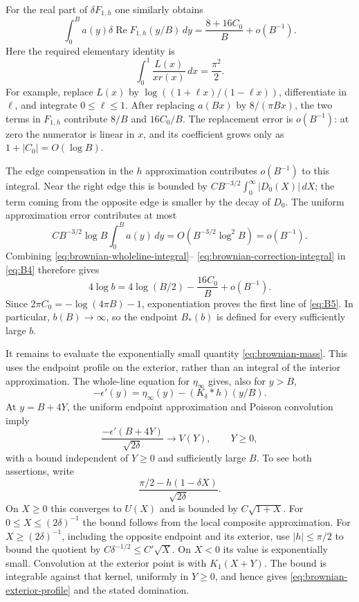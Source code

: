 For the real part of $\delta F_{1,h}$ one similarly obtains
\begin{equation}
 \int_0^B a(y)\delta\operatorname{Re}F_{1,h}(y/B)\,dy
                 =\frac{8+16C_0}{B}+o(B^{-1}).
 \label{eq:brownian-correction-integral}
\end{equation}
Here the required elementary identity is
\[
 \int_0^1\frac{L(x)}{x r(x)}\,dx=\frac{\pi^2}{2}.
\]
For example, replace $L(x)$ by
$\log((1+\ell x)/(1-\ell x))$, differentiate in $\ell$, and integrate
$0\le\ell\le1$.  After replacing $a(Bx)$ by $8/(\pi Bx)$, the two
terms in $F_{1,h}$ contribute $8/B$ and $16C_0/B$.
The replacement error is $o(B^{-1})$: at zero the numerator is linear
in $x$, and its coefficient grows only as $1+|C_0|=O(\log B)$.

The edge compensation in the $h$ approximation contributes $o(B^{-1})$
to this integral.  Near the right edge this is bounded by
$CB^{-3/2}\int_0^\infty|D_0(X)|\,dX$; the term coming from the opposite
edge is smaller by the decay of $D_0$.  The uniform approximation error
contributes at most
\[
 C B^{-3/2}\log B\int_0^B a(y)\,dy
           =O(B^{-3/2}\log^2B)=o(B^{-1}).
\]
Combining \eqref{eq:brownian-wholeline-integral}--
\eqref{eq:brownian-correction-integral} in \eqref{eq:B4} therefore gives
\[
 4\log b=4\log(B/2)-\frac{16C_0}{B}+o(B^{-1}).
\]
Since $2\pi C_0=-\log(4\pi B)-1$, exponentiation proves the first
line of \eqref{eq:B5}.  In particular, $b(B)\to\infty$, so the endpoint
$B_*(b)$ is defined for every sufficiently large $b$.

It remains to evaluate the exponentially small quantity
\eqref{eq:brownian-mass}.  This uses the endpoint profile on the exterior,
rather than an integral of the interior approximation.  The whole-line
equation for $\eta_\infty$ gives, also for $y>B$,
\[
 -\epsilon'(y)=\eta_\infty(y)-(K_\delta*h)(y/B).
\]
At $y=B+4Y$, the uniform endpoint approximation and Poisson convolution
imply
\begin{equation}
 \frac{-\epsilon'(B+4Y)}{\sqrt{2\delta}}\longrightarrow V(Y),
 \qquad Y\ge0,
 \label{eq:brownian-exterior-profile}
\end{equation}
with a bound independent of $Y\ge0$ and sufficiently large $B$.
To see both assertions, write
\[
 \frac{\pi/2-h(1-\delta X)}{\sqrt{2\delta}}.
\]
On $X\ge0$ this converges to $U(X)$ and is bounded by
$C\sqrt{1+X}$.  For $0\le X\le(2\delta)^{-1}$ the bound follows from
the local composite approximation.  For $X\ge(2\delta)^{-1}$, including
the opposite endpoint and its exterior, use $|h|\le\pi/2$ to bound the
quotient by $C\delta^{-1/2}\le C'\sqrt X$.  On $X<0$ its value is
exponentially small.
Convolution at the exterior point is with $K_1(X+Y)$.  The bound is
integrable against that kernel, uniformly in $Y\ge0$, and hence gives
\eqref{eq:brownian-exterior-profile} and the stated domination.

